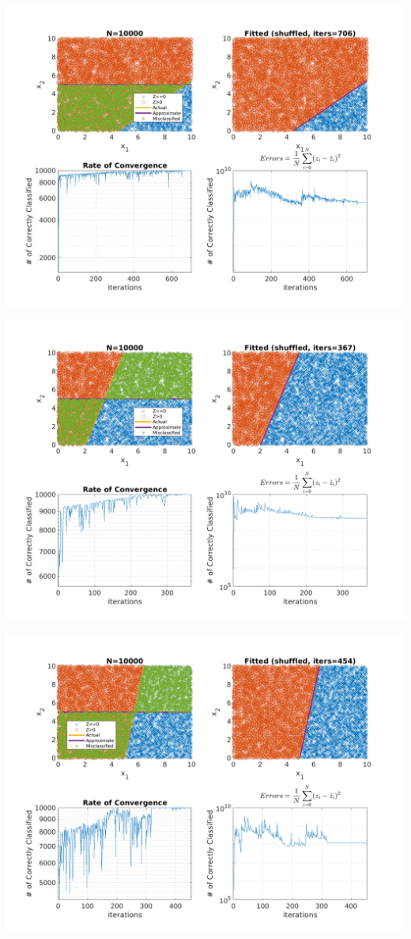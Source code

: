 \documentclass{article}
\newenvironment{Figure}
  {\par\medskip\noindent\minipage{\linewidth}}
  {\endminipage\par\medskip}
\begin{document}
\begin{multicols}{2}
\begin{Figure}
\centering
\includegraphics[width=\linewidth]{pngs/n10000_shuffled1.png}
\end{Figure}
\begin{Figure}
\centering
\includegraphics[width=\linewidth]{pngs/n10000_shuffled2.png}
\end{Figure}
\begin{Figure}
\centering
\includegraphics[width=\linewidth]{pngs/n10000_shuffled3.png}

\end{Figure}
\end{multicols}
\end{document}
